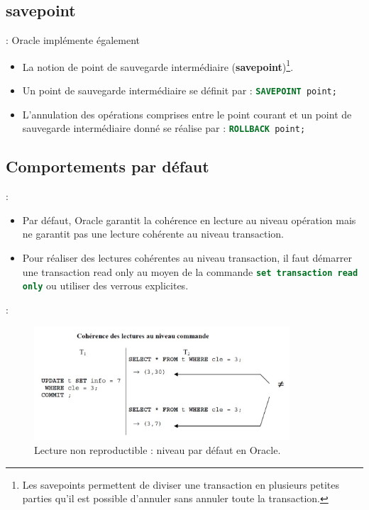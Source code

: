\documentclass[10pt]{beamer}
\begin{document}
\subsection{savepoint}
\begin{frame}{\secname : \subsecname}
    Oracle implémente également
    \begin{itemize}
        \item La notion de point de sauvegarde intermédiaire (\textbf{savepoint})\footnote{ Les savepoints permettent de diviser une transaction en plusieurs petites parties qu'il est possible d'annuler sans annuler toute la transaction.}.
        \item Un point de sauvegarde intermédiaire se définit par : \lstinline[language=sql]!SAVEPOINT point;!
        \item L'annulation des opérations comprises entre le point courant et un point de sauvegarde intermédiaire donné se réalise par : \lstinline[language=sql]!ROLLBACK point;!
    \end{itemize}
\end{frame}
\subsection{Comportements par défaut}
\begin{frame}{\secname : \subsecname}
    \begin{itemize}
        \item Par défaut, Oracle garantit la cohérence en lecture au niveau opération mais ne garantit pas une lecture cohérente au niveau transaction.
        \item Pour réaliser des lectures cohérentes au niveau transaction, il faut démarrer une transaction read only au moyen de la commande \lstinline[language=sql]!set transaction read only! ou utiliser des verrous explicites.
    \end{itemize}
\end{frame}

\begin{frame}{\secname : \subsecname}
    \begin{figure}
        \begin{center}
            \includegraphics[width=0.85\textwidth]{../assets/img/coherence-de-lecture.pdf}
            \caption{Lecture non reproductible : niveau par défaut en Oracle.}
        \end{center}
    \end{figure}
\end{frame}
\end{document}
